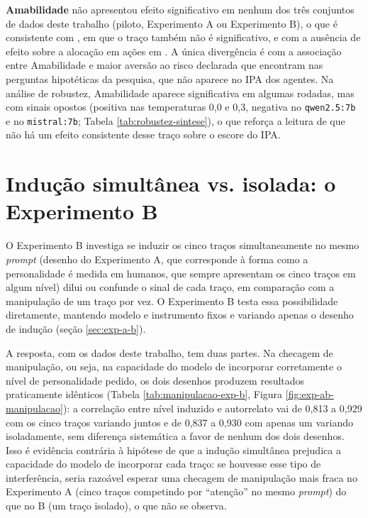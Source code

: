 \textbf{Amabilidade} não apresentou efeito significativo em nenhum dos
três conjuntos de dados deste trabalho (piloto, Experimento A ou
Experimento B), o que é consistente com , em
que o traço também não é significativo, e com a ausência de efeito
sobre a alocação em ações em . A única
divergência é com a associação entre Amabilidade e maior aversão ao
risco declarada que  encontram nas perguntas
hipotéticas da pesquisa, que não aparece no IPA dos agentes. Na análise de
robustez, Amabilidade aparece significativa em algumas rodadas, mas com
sinais opostos (positiva nas temperaturas 0,0 e 0,3, negativa no
\texttt{qwen2.5:7b} e no \texttt{mistral:7b}; Tabela
\ref{tab:robustez-sintese}), o que reforça a leitura de que não há um
efeito consistente desse traço sobre o escore do IPA.

\section{Indução simultânea vs. isolada: o Experimento B}
\label{sec:discussao-exp-b}

O Experimento B investiga se induzir os cinco traços simultaneamente no
mesmo \textit{prompt} (desenho do Experimento A, que corresponde à forma
como a personalidade é medida em humanos, que sempre apresentam os cinco
traços em algum nível) dilui ou confunde o sinal de cada traço, em
comparação com a manipulação de um traço por vez.
O Experimento B testa essa possibilidade diretamente, mantendo modelo e
instrumento fixos e variando apenas o desenho de indução (seção
\ref{sec:exp-a-b}).

A resposta, com os dados deste trabalho, tem duas partes. Na
checagem de manipulação, ou seja, na capacidade do modelo de
incorporar corretamente o nível de personalidade pedido, os dois
desenhos produzem resultados praticamente idênticos (Tabela
\ref{tab:manipulacao-exp-b}, Figura \ref{fig:exp-ab-manipulacao}): a
correlação entre nível induzido e autorrelato vai de 0,813 a 0,929 com os
cinco traços variando juntos e de 0,837 a 0,930 com apenas um variando
isoladamente, sem diferença sistemática a favor de nenhum dos dois
desenhos. Isso é evidência contrária à hipótese de que a indução
simultânea prejudica a capacidade do modelo de incorporar cada traço: se
houvesse esse tipo de interferência, seria razoável esperar uma checagem
de manipulação mais fraca no Experimento A (cinco traços competindo por
``atenção'' no mesmo \textit{prompt}) do que no B (um traço isolado), o
que não se observa.

